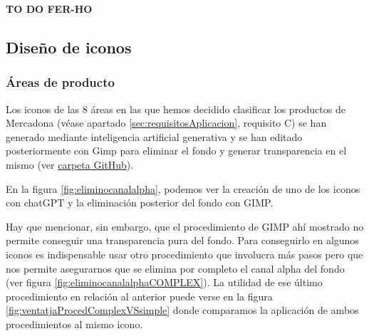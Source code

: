 \documentclass[a4paper,12pt]{report}
\begin{document}
	\textbf{TO DO FER-HO}
	
	
	\subsection{Diseño de iconos}
	
	\subsubsection{Áreas de producto}
	
	Los iconos de las 8 áreas en las que hemos decidido clasificar los productos de Mercadona (véase apartado \ref{sec:requisitosAplicacion}, requisito C) se han generado mediante inteligencia artificial generativa y se han editado posteriormente con Gimp para eliminar el fondo y generar transparencia en el mismo (ver \href{https://github.com/blackcub3s/mercApp/tree/main/creacioIconos/categoriesProductes}{carpeta GitHub}).
	
	
	En la figura \ref{fig:eliminocanalalpha}, podemos ver la creación de uno de los iconos con chatGPT y la eliminación posterior del fondo con GIMP. 
	
	Hay que mencionar, sin embargo, que el procedimiento de GIMP ahí mostrado no permite conseguir una transparencia pura del fondo. Para conseguirlo en algunos iconos es indispensable usar otro procedimiento que involucra más pasos pero que nos permite asegurarnos que se elimina por completo el canal alpha del fondo (ver figura \ref{fig:eliminocanalalphaCOMPLEX}). La utilidad de ese último procedimiento en relación al anterior puede verse en la figura \ref{fig:ventatjaProcedComplexVSsimple} donde comparamos la aplicación de ambos procedimientos al mismo icono.


	
	
	
	
\end{document}
